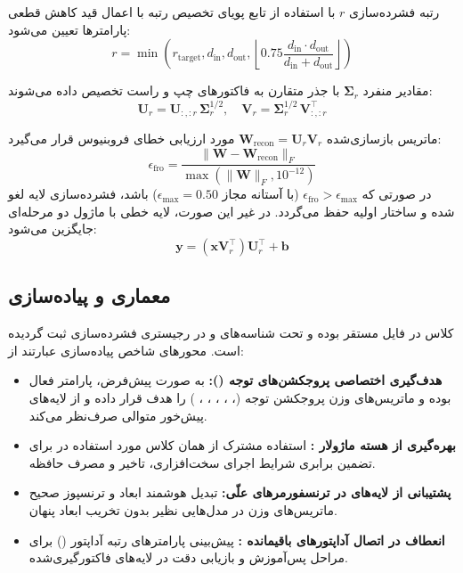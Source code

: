 رتبه فشرده‌سازی $r$ با استفاده از تابع پویای تخصیص رتبه با اعمال قید کاهش قطعی پارامترها تعیین می‌شود:
\begin{equation}
r = \min\left(r_{\text{target}}, d_{\text{in}}, d_{\text{out}}, \left\lfloor 0.75 \frac{d_{\text{in}} \cdot d_{\text{out}}}{d_{\text{in}} + d_{\text{out}}} \right\rfloor \right)
\end{equation}

مقادیر منفرد $\mathbf{\Sigma}_r$ با جذر متقارن به فاکتورهای چپ و راست تخصیص داده می‌شوند:
\begin{equation}
\mathbf{U}_r = \mathbf{U}_{:, :r} \, \mathbf{\Sigma}_r^{1/2}, \quad \mathbf{V}_r = \mathbf{\Sigma}_r^{1/2} \, \mathbf{V}_{:, :r}^\top
\end{equation}

ماتریس بازسازی‌شده $\mathbf{W}_{\text{recon}} = \mathbf{U}_r \mathbf{V}_r$ مورد ارزیابی خطای فروبنیوس قرار می‌گیرد:
\begin{equation}
\epsilon_{\text{fro}} = \frac{\|\mathbf{W} - \mathbf{W}_{\text{recon}}\|_F}{\max(\|\mathbf{W}\|_F, 10^{-12})}
\end{equation}
در صورتی که $\epsilon_{\text{fro}} > \epsilon_{\text{max}}$ (با آستانه مجاز $\epsilon_{\text{max}} = 0.50$) باشد، فشرده‌سازی لایه لغو شده و ساختار اولیه حفظ می‌گردد. در غیر این صورت، لایه خطی با ماژول دو مرحله‌ای جایگزین می‌شود:
\begin{equation}
\mathbf{y} = (\mathbf{x} \mathbf{V}_r^\top) \mathbf{U}_r^\top + \mathbf{b}
\end{equation}

\subsection{معماری و پیاده‌سازی}
کلاس  در فایل  مستقر بوده و تحت شناسه‌های  و  در رجیستری فشرده‌سازی ثبت گردیده است. محورهای شاخص پیاده‌سازی عبارتند از:
\begin{itemize}
    \item \textbf{هدف‌گیری اختصاصی پروجکشن‌های توجه ():} به صورت پیش‌فرض، پارامتر  فعال بوده و ماتریس‌های وزن پروجکشن توجه (، ، ، ، ، ) را هدف قرار داده و از لایه‌های پیش‌خور متوالی صرف‌نظر می‌کند.
    \item \textbf{بهره‌گیری از هسته ماژولار :} استفاده مشترک از همان کلاس  مورد استفاده در  برای تضمین برابری شرایط اجرای سخت‌افزاری، تاخیر و مصرف حافظه.
    \item \textbf{پشتیبانی از لایه‌های  در ترنسفورمرهای علّی:} تبدیل هوشمند ابعاد و ترنسپوز صحیح ماتریس‌های وزن در مدل‌هایی نظیر  بدون تخریب ابعاد پنهان.
    \item \textbf{انعطاف در اتصال آداپتورهای باقیمانده :} پیش‌بینی پارامترهای رتبه آداپتور () برای مراحل پس‌آموزش و بازیابی دقت در لایه‌های فاکتورگیری‌شده.
\end{itemize}

